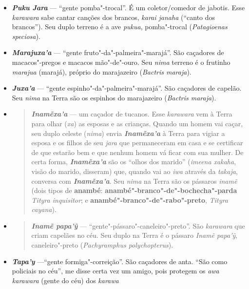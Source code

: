 \begin{itemize}
  \emph{\textbf{Jakare Jara}} --- ``gente"-jacaré''. Caçadores/comedores
  de paca.
\item
  \emph{\textbf{Puku Jara}} --- ``gente pomba"-trocal''. É um
  coletor/comedor de jabotis. Esse \emph{karawara} sabe cantar canções
  dos brancos, \emph{karai janaha} (``canto dos brancos''). Seu duplo
  terreno é a ave \emph{pukua}, pomba"-trocal (\emph{Patagioenas
  speciosa}).
\item
  \emph{\textbf{Marajuxa'a}} --- ``gente fruto"-da"-palmeira"-marajá''. São
  caçadores de macacos"-pregos e macacos mão"-de"-ouro. Seu \emph{nima}
  terreno é o frutinho \emph{marajua} (marajá), próprio do marajazeiro
  (\emph{Bactris maraja}).
\item
  \emph{\textbf{Juxa'a}} --- ``gente espinho"-da"-palmeira"-marajá''. São
  caçadores de capelão. Seu \emph{nima} na Terra são os espinhos do
  marajazeiro (\emph{Bactris maraja}).
\item
  \begin{quote}
  \emph{\textbf{Inamẽxa'a}} --- um caçador de tucanos. Esse \emph{karawara}
  vem à Terra para olhar (\emph{xa}) as esposas e as crianças. Quando um
  homem vai caçar, seu duplo celeste (\emph{nima}) envia
  \emph{\textbf{Inamẽxa'a}} à Terra para vigiar a esposa e os filhos de
  seu \emph{jara} que permaneceram em casa e se certificar de que
  estarão bem e que nenhum homem vá ficar com sua mulher. De certa
  forma, \emph{\textbf{Inamẽxa'a}} são os ``olhos dos marido''
  (\emph{imeena xakaha}, visão do marido, disseram) que, quando vai ao
  \emph{iwa} através da \emph{takaja}, conversa com
  \emph{\textbf{Inamẽxa'a}}. Seu \emph{nima} na Terra são os pássaros
  \emph{inamẽ} (dois tipos de \textbf{anambé}:
  \textbf{anambé"-branco"-de"-bochecha"-parda} \emph{Tityra inquisitor}; e
  \textbf{anambé"-branco"-de"-rabo"-preto}, \emph{Tityra} \emph{cayana}).
  \end{quote}
\item
  \begin{quote}
  \emph{\textbf{Inamẽ papa'ỹ}} --- ``gente"-pássaro"-caneleiro"-preto''. São
  \emph{karawara} que criam capelães no céu. Seu duplo na Terra é o
  pássaro \emph{Inamẽ papa'ỹ}, caneleiro"-preto (\emph{Pachyramphus
  polychopterus}).
  \end{quote}
\item
  \emph{\textbf{Tapa'y}} ---``gente formiga"-correição''. São caçadores de
  anta. ``São como policiais no céu'', me disse certa vez um amigo, pois
  protegem os \emph{awa} \emph{karawara} (gente do céu) dos \emph{karawa
}
\end{itemize}
